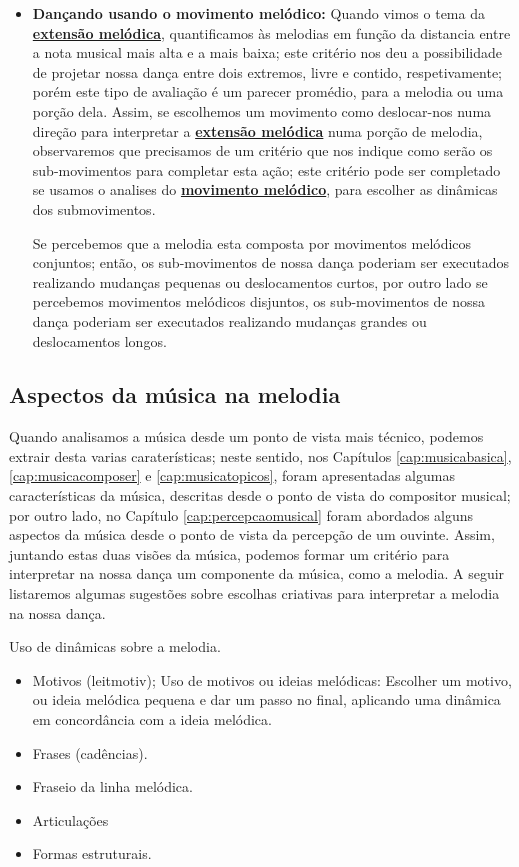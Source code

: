 \begin{itemize}
\item \textbf{Dançando usando o movimento melódico:}
Quando vimos o tema da \hyperref[ref:melodica:range]{\textbf{extensão melódica}},
quantificamos às melodias em função da distancia entre a nota musical mais alta e a mais baixa;
este critério nos deu a possibilidade de projetar nossa dança entre dois extremos,
livre e contido, respetivamente;
porém este tipo de avaliação é um parecer promédio,
para a melodia ou uma porção dela. 
Assim, se escolhemos um movimento como deslocar-nos numa direção 
para interpretar a \hyperref[ref:melodica:range]{\textbf{extensão melódica}} numa porção de melodia,
observaremos que precisamos de um critério que nos indique como serão os sub-movimentos para completar esta ação;
este critério pode ser completado se usamos o analises do \hyperref[ref:melodica:movimento]{\textbf{movimento melódico}},
para escolher as dinâmicas dos submovimentos.
\begin{example}
Se percebemos que a melodia esta composta por movimentos melódicos conjuntos;
então, 
os sub-movimentos de nossa dança poderiam ser executados realizando mudanças pequenas ou deslocamentos curtos,
por outro lado se percebemos movimentos melódicos disjuntos,
os sub-movimentos de nossa dança poderiam ser executados realizando mudanças grandes ou deslocamentos longos.
\end{example}
\end{itemize}


\subsection{Aspectos da música na melodia} 
Quando analisamos a música desde um ponto de vista mais técnico, 
podemos extrair desta varias caraterísticas; 
neste sentido, nos Capítulos \ref{cap:musicabasica},
\ref{cap:musicacomposer} e \ref{cap:musicatopicos},
foram apresentadas algumas características da música, 
descritas desde o ponto de vista do compositor musical;
por outro lado, no Capítulo \ref{cap:percepcaomusical} 
foram abordados alguns aspectos da música desde o ponto de vista da percepção de um ouvinte.
Assim, juntando estas duas visões da música,
podemos formar um critério para interpretar  na nossa dança um componente da música, como a melodia.
A seguir listaremos algumas sugestões sobre escolhas criativas para interpretar a melodia na nossa dança.

Uso de dinâmicas sobre a melodia. 
\begin{itemize}
\item Motivos (leitmotiv); Uso de motivos ou ideias melódicas: Escolher um motivo, ou ideia melódica pequena e dar um passo no final, 
aplicando uma dinâmica em concordância com a ideia melódica.
\item Frases (cadências).
\item Fraseio da linha melódica.
\item Articulações
\item Formas estruturais.
\end{itemize}



